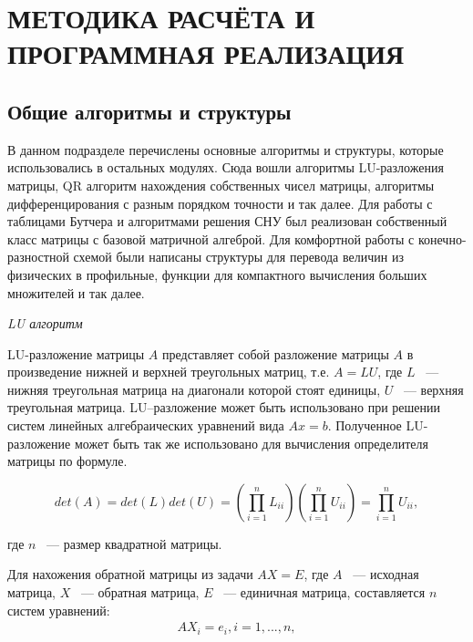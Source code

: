 \section{МЕТОДИКА РАСЧЁТА И ПРОГРАММНАЯ РЕАЛИЗАЦИЯ} %



\subsection{Общие алгоритмы и структуры}

В данном подразделе перечислены основные алгоритмы и структуры, которые использовались в остальных модулях. Сюда вошли алгоритмы LU-разложения матрицы, QR алгоритм нахождения собственных чисел матрицы, алгоритмы дифференцирования с разным порядком точности и так далее. Для работы с таблицами Бутчера и алгоритмами решения СНУ был реализован собственный класс матрицы с базовой матричной алгеброй. Для комфортной работы с конечно-разностной схемой были написаны структуры для перевода величин из физических в профильные, функции для компактного вычисления больших множителей и так далее.

\textit{LU алгоритм}

LU-разложение матрицы \cite{Article1} $A$ представляет собой разложение матрицы $A$ в произведение нижней и верхней треугольных матриц, т.е. $A = LU$, где $L$ ~--- нижняя треугольная матрица на диагонали которой стоят единицы, $U$ ~--- верхняя треугольная матрица. LU–разложение может быть использовано при решении систем линейных алгебраических уравнений вида $Ax = b$. Полученное LU-разложение может быть так же использовано для вычисления определителя матрицы по формуле.

\begin{equation}
    det(A) = det(L)det(U) = (\prod\limits_{i = 1}^nL_{ii})(\prod\limits_{i = 1}^nU_{ii}) = \prod\limits_{i = 1}^nU_{ii},
    \label{eq:Det}
\end{equation}

где $n$ ~--- размер квадратной матрицы.

Для нахожения обратной матрицы из задачи $AX = E$, где $A$ ~--- исходная матрица, $X$ ~--- обратная матрица, $E$ ~--- единичная
матрица, составляется $n$ систем уравнений:
\begin{equation}
    \begin{gathered}
        AX_i = e_i,  i = 1, ..., n,
    \end{gathered}
    \label{eq:Reverse}
\end{equation}

